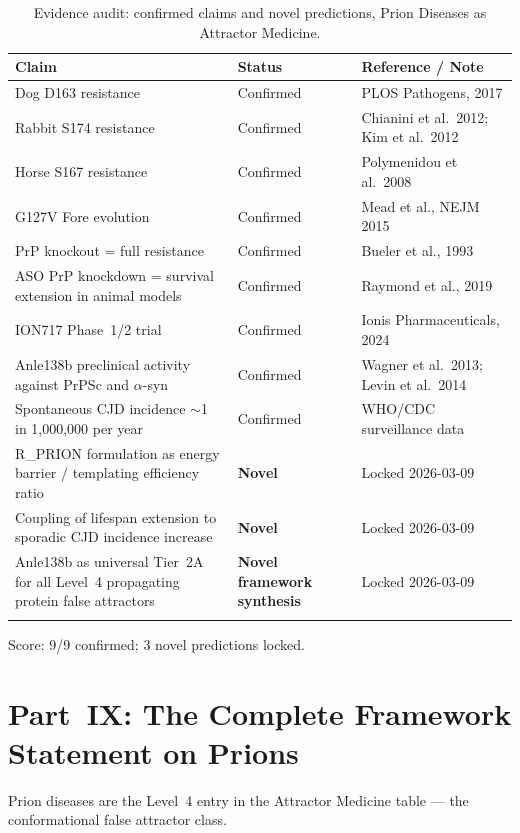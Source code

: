 \documentclass[12pt,a4paper]{article}
\begin{document}
\begin{longtable}{p{5cm} p{3.5cm} p{5cm}}
  \toprule
  \textbf{Claim} & \textbf{Status} & \textbf{Reference / Note} \\
  \midrule
  Dog D163 resistance & Confirmed & PLOS Pathogens, 2017 \\
  Rabbit S174 resistance & Confirmed & Chianini et al.\ 2012; Kim et al.\ 2012 \\
  Horse S167 resistance & Confirmed & Polymenidou et al.\ 2008 \\
  G127V Fore evolution & Confirmed & Mead et al., NEJM 2015 \\
  PrP knockout = full resistance & Confirmed & Bueler et al., 1993 \\
  ASO PrP knockdown = survival extension in animal models & Confirmed & Raymond et al., 2019 \\
  ION717 Phase~1/2 trial & Confirmed & Ionis Pharmaceuticals, 2024 \\
  Anle138b preclinical activity against PrPSc and $\alpha$-syn & Confirmed & Wagner et al.\ 2013; Levin et al.\ 2014 \\
  Spontaneous CJD incidence $\sim$1 in 1,000,000 per year & Confirmed & WHO/CDC surveillance data \\
  \midrule
  R\_PRION formulation as energy barrier / templating efficiency ratio & \textbf{Novel} & Locked 2026-03-09 \\
  Coupling of lifespan extension to sporadic CJD incidence increase & \textbf{Novel} & Locked 2026-03-09 \\
  Anle138b as universal Tier~2A for all Level~4 propagating protein false attractors & \textbf{Novel framework synthesis} & Locked 2026-03-09 \\
  \bottomrule
  \caption{Evidence audit: confirmed claims and novel predictions, Prion
    Diseases as Attractor Medicine.}
\end{longtable}

Score: 9/9 confirmed; 3 novel predictions locked.

\section{Part~IX: The Complete Framework Statement on Prions}

Prion diseases are the Level~4 entry in the Attractor Medicine table ---
the conformational false attractor class.
\end{document}

